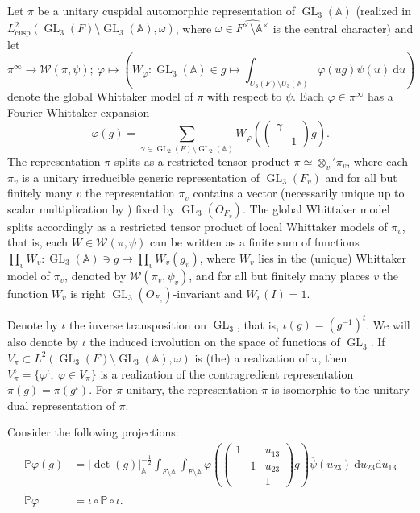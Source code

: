 \documentclass[a4paper,11pt]{amsart}
\theoremstyle{definition}
\newcommand{\A}{\mathbb{A}}
\newcommand{\gelle}{\operatorname{GL}}
\begin{document}
Let $\pi$ be a unitary cuspidal automorphic representation of $\gelle_3(\A)$ (realized in $L_{\operatorname{cusp}}^2(\gelle_3(F)\setminus\gelle_3(\A),\omega)$, where $\omega\in \widehat{F^{\times}\setminus\A^{\times}}$ is the central character) and let \[\pi^{\infty} \to \mathcal{W}(\pi,\psi);\ \varphi\mapsto \left(W_{\varphi}\colon \gelle_3(\A) \in g\mapsto \int_{U_3(F)\setminus U_3(\A)}\varphi(ug)\overline{\psi}(u) \ \mathrm{d}u\right)\]
denote the global Whittaker model of $\pi$ with respect to $\psi$. 
Each $\varphi \in \pi^{\infty}$ has a Fourier-Whittaker expansion 
\[ \varphi(g) = \sum_{\gamma \in \gelle_2(F)\setminus\gelle_2(\A)}W_{\varphi}\left(\begin{pmatrix}
    \gamma&\\&1
\end{pmatrix}g\right).\]
The representation $\pi$ splits as a restricted tensor product $\pi \simeq \otimes_v' \pi_v$, where each $\pi_v$ is a unitary irreducible generic representation of $\gelle_3(F_v)$ and for all but finitely many $v$ the representation $\pi_v$ contains a vector (necessarily unique up to scalar multiplication by \cite{Shalika}) fixed by $\gelle_3(O_{F_v})$. 
The global Whittaker model splits accordingly as a restricted tensor product of local Whittaker models of $\pi_v$, that is, each $W\in \mathcal{W}(\pi,\psi)$ can be written as a finite sum of functions $\prod_vW_v \colon \gelle_3(\A) \ni g \mapsto \prod_vW_v(g_v)$, where $W_v$ lies in the (unique) Whittaker model of $\pi_v$,  denoted by $\mathcal{W}(\pi_v,\psi_v)$, and for all but finitely many places $v$ the function $W_v$ is right $\gelle_3(O_{F_v})$-invariant and $W_v(I)=1$.

Denote by $\iota$ the inverse transposition on $\gelle_3$, that is, $\iota(g) = (g^{-1})^t$. We will also denote by $\iota$ the induced involution on the space of functions of $\gelle_3$. If $V_{\pi} \subset L^2(\gelle_3(F)\setminus\gelle_3(\A),\omega)$ is (the) a realization of $\pi$, then $V_{\pi}^{\iota} = \{\varphi^{\iota},\ \varphi \in V_{\pi}\}$ is a realization of the contragredient representation $\tilde{\pi}(g) = \pi(g^{\iota})$. For $\pi$ unitary, the representation $\tilde{\pi}$ is isomorphic to the unitary dual representation of $\pi$.   



Consider the following projections:
\begin{align}
    \mathbb{P}\varphi(g)&= \vert{\det(g)}\vert_{\A}^{-\frac{1}{2}}\int_{F\setminus \A}\int_{F\setminus\A}\varphi\left(\begin{pmatrix}
    1&&u_{13}\\&1&u_{23}\\&&1
\end{pmatrix}g\right)\overline{\psi}(u_{23})\ \mathrm{d}u_{23}\mathrm{d}u_{13} \label{eq:definitionPphi}\\
\tilde{\mathbb{P}}\varphi&= \iota \circ \mathbb{P}\circ \iota. \nonumber
\end{align}
\end{document}
